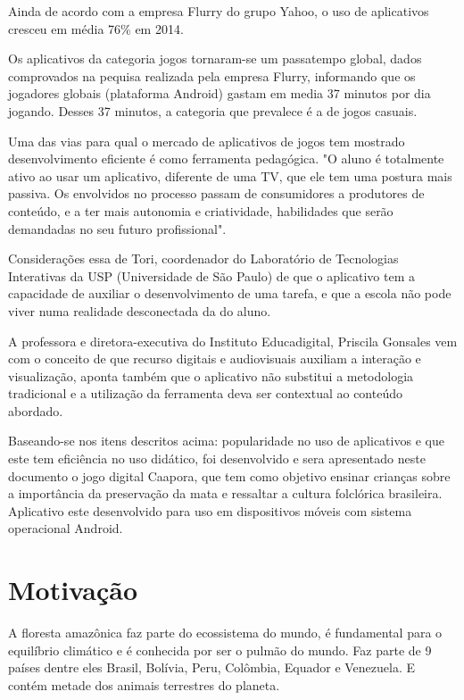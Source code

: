 Ainda de acordo com a empresa Flurry do grupo Yahoo, o uso de aplicativos cresceu em média 76\% em 2014. \cite{prox}
	
	
Os aplicativos da categoria jogos tornaram-se um passatempo global, dados comprovados na pequisa  realizada pela empresa Flurry, informando que os jogadores globais (plataforma Android) gastam em media 37 minutos por dia jogando. Desses 37 minutos, a categoria que prevalece é a de jogos casuais. \cite{flur}

Uma das vias para qual o mercado de aplicativos de jogos tem mostrado desenvolvimento eficiente é como ferramenta pedagógica.
"O aluno é totalmente ativo ao usar um aplicativo, diferente de uma TV, que ele tem uma postura mais passiva. Os envolvidos no processo passam de consumidores a produtores de conteúdo, e a ter mais autonomia e criatividade, habilidades que serão demandadas no seu futuro profissional".

Considerações essa de Tori, coordenador do Laboratório de Tecnologias Interativas da USP (Universidade de São Paulo) de que o aplicativo tem a capacidade de auxiliar o desenvolvimento de uma tarefa, e que a escola não pode viver numa realidade desconectada da do aluno.

A professora e diretora-executiva do Instituto Educadigital, Priscila Gonsales vem com o conceito de que recurso digitais e audiovisuais auxiliam a interação e visualização, aponta também que o aplicativo não substitui a metodologia tradicional e a utilização da ferramenta deva ser contextual ao conteúdo abordado. \cite{tori}

Baseando-se nos itens descritos acima: popularidade no uso de aplicativos e que este tem eficiência no uso didático, foi desenvolvido e sera apresentado neste documento o jogo digital Caapora, que tem como objetivo ensinar crianças sobre a importância da preservação da mata e ressaltar a cultura folclórica brasileira.
Aplicativo este desenvolvido para uso em  dispositivos móveis com sistema operacional Android.

\section{Motivação}
\label{cap:motivacao}

A floresta amazônica faz parte do ecossistema do mundo, é fundamental para o equilíbrio climático e é conhecida por ser o pulmão do mundo. Faz parte de 9 países dentre eles Brasil, Bolívia, Peru, Colômbia, Equador e Venezuela. E contém metade dos animais terrestres do planeta.

